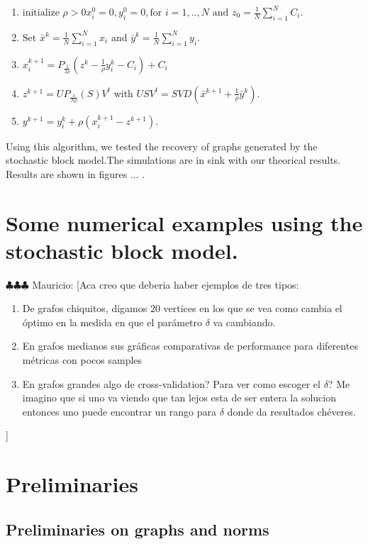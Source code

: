 \documentclass[12pt]{amsart}
\theoremstyle{remark}
\newcommand{\mv}[1]{{\color{red} \sf $\clubsuit\clubsuit\clubsuit$ Mauricio: [#1]}}
\begin{document}
\begin{enumerate}
\item $\text{initialize } \rho >0 x_i^0=0, y_i^0=0, \text{for } i=1,..,N \text{ and } z_0= \frac{1}{N}\sum_{i=1}^N C_i$.
\item $ \text{Set } \bar{x}^{k} = \frac{1}{N}\sum_{i=1}^N x_i $ and $\bar{y}^{k} = \frac{1}{N}\sum_{i=1}^N y_i $.
\item $x_i^{k+1}=P_{\frac{1}{2\rho}}(z^k-\frac{1}{\rho}y_i^k-C_i)+C_i$
\item $z^{k+1} = UP_{\frac{\lambda}{N\rho}}(S)V^t$ with $USV^t = SVD(\bar{x}^{k+1}+\frac{1}{\rho}\bar{y}^k)$.
\item $y^{k+1} =y_i^k + \rho(x_i^{k+1}-z^{k+1}). $ 

\end{enumerate}


Using this algorithm, we tested the recovery of graphs generated by the stochastic block model.The simulations are in sink with our theorical results.  Results are shown in figures ... .



\section{Some numerical examples using the stochastic block model.}
\label{Numerics}
\mv{Aca creo que deberia haber ejemplos de tres tipos:
\begin{enumerate}
\item De grafos chiquitos, digamos 20 vertices en los que se vea como cambia el \'optimo en la medida en que el par\'ametro $\delta$ va cambiando.
\item En grafos medianos sus gr\'aficas comparativas de performance para diferentes m\'etricas con pocos samples
\item En grafos grandes algo de cross-validation? Para ver como escoger el $\delta$? Me imagino que si uno va viendo que tan lejos esta de ser entera la solucion entonces uno puede encontrar un rango para $\delta$ donde da resultados ch\'everes.
\end{enumerate}

}

\section{Preliminaries}





\subsection{ Preliminaries on graphs and norms}
\end{document}

